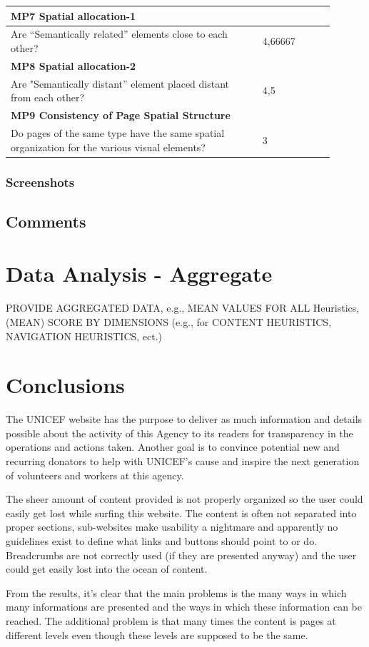 \begin{longtable}{|p{0.7\linewidth}|p{0.2\linewidth}|}
\multicolumn{2}{|l|}{\textbf{MP7 Spatial allocation-1}} \\
\hline
Are “Semantically related” elements close to each other? & 4,66667  \\
\hline

\multicolumn{2}{|l|}{\textbf{MP8 Spatial allocation-2}} \\
\hline
Are "Semantically distant” element placed distant from each other? & 4,5  \\
\hline

\multicolumn{2}{|l|}{\textbf{MP9 Consistency of Page Spatial Structure}} \\
\hline
Do pages of the same type have the same spatial organization for the various visual elements? & 3  \\
\hline

\end{longtable}

\subsubsection{Screenshots}

\subsection{Comments}

\section{Data Analysis - Aggregate}
PROVIDE AGGREGATED DATA, e.g., MEAN VALUES FOR ALL Heuristics,
(MEAN) SCORE BY DIMENSIONS (e.g., for CONTENT HEURISTICS,
NAVIGATION HEURISTICS, ect.)

\section{Conclusions}
The UNICEF website has the purpose to deliver as much information and details possible about the activity of this Agency to its readers for transparency in the operations and actions taken. Another goal is to convince potential new and recurring donators to help with UNICEF's cause and inspire the next generation of volunteers and workers at this agency.

The sheer amount of content provided is not properly organized so the user could easily get lost while surfing this website. The content is often not separated into proper sections, sub-websites make usability a nightmare and apparently no guidelines exist to define what links and buttons should point to or do. Breadcrumbs are not correctly used (if they are presented anyway) and the user could get easily lost into the ocean of content.

From the results, it's clear that the main problems is the many ways in which many informations are presented and the ways in which these information can be reached. The additional problem is that many times the content is pages at different levels even though these levels are supposed to be the same.
